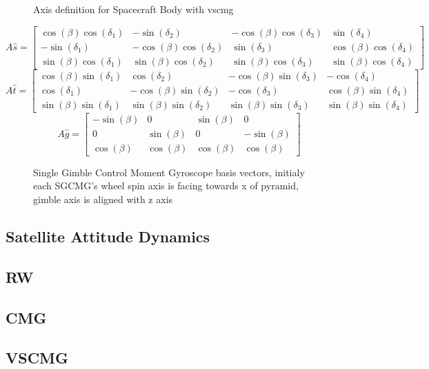 \begin{figure}[!h]
    \centering
    
    \caption{Axis definition for Spacecraft Body with \acrfull{vscmg}}
    \label{fig:tikCMG}
\end{figure}
\usetikzlibrary{shapes}


\begin{equation*}
A\hat{s} =
\begin{bmatrix}
\cos(\beta) \cos(\delta_1) & -\sin(\delta_2) & -\cos(\beta) \cos(\delta_3) &  \sin(\delta_4) \\
-\sin(\delta_1) & -\cos(\beta) \cos(\delta_2) &  \sin(\delta_3) &  \cos(\beta) \cos(\delta_4) \\
\sin(\beta) \cos(\delta_1) &  \sin(\beta) \cos(\delta_2) &  \sin(\beta) \cos(\delta_3) &  \sin(\beta) \cos(\delta_4) 
\end{bmatrix}
\end{equation*}
\begin{equation*}
A\hat{t} =
\begin{bmatrix}
\cos(\beta) \sin(\delta_1) &         \cos(\delta_2) & -\cos(\beta) \sin(\delta_3) &       -\cos(\delta_4) \\
       \cos(\delta_1) & -\cos(\beta) \sin(\delta_2) &        -\cos(\delta_3) & \cos(\beta) \sin(\delta_4) \\
\sin(\beta) \sin(\delta_1) &  \sin(\beta) \sin(\delta_2) &  \sin(\beta) \sin(\delta_3) & \sin(\beta) \sin(\delta_4)

\end{bmatrix}
\end{equation*}
\begin{equation*}
A\hat{g} = 
\begin{bmatrix}
 -\sin(\beta) &      0 & \sin(\beta) &       0 \\
       0 & \sin(\beta) &      0 & -\sin(\beta) \\
  \cos(\beta) & \cos(\beta) & \cos(\beta) &  \cos(\beta)
\end{bmatrix}
\end{equation*}



\begin{figure}[ht]
\centering

\caption{Single Gimble Control Moment Gyroscope basis vectors, initialy each SGCMG's wheel spin axis is facing towards x of pyramid, gimble axis is aligned with z axis}
\label{fig:sgcmg}
\end{figure}

\subsection{Satellite Attitude Dynamics}
\subsection{RW}
\subsection{CMG}
\subsection{VSCMG}
